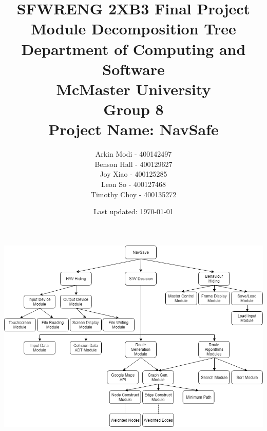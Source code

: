\documentclass[12pt]{article}
\title{
    SFWRENG 2XB3 Final Project \\
    \large Module Decomposition Tree\\
    \vspace{1ex}
    \large Department of Computing and Software\\
    \large McMaster University\\
    \vspace{1ex}
    \large Group 8\\
    \large Project Name: NavSafe
}
\author{
    Arkin Modi - 400142497\\
    Benson Hall - 400129627\\
    Joy Xiao - 400125285\\
    Leon So - 400127468\\
    Timothy Choy - 400135272
}
\date{Last updated: \today}
\begin{document}
\maketitle
\newpage
\begin{landscape}
\includegraphics[scale=0.75]{DecompTree.png}
\end{landscape}
\end{document}
